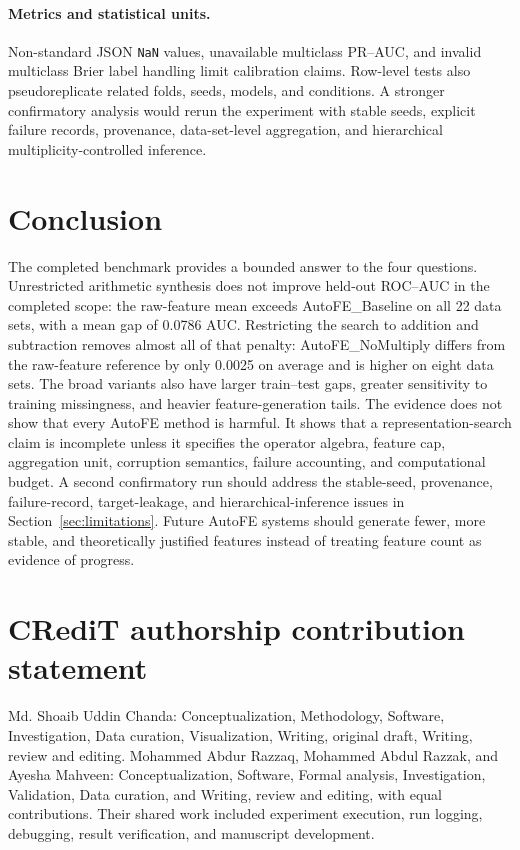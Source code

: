 \documentclass[preprint,12pt]{elsarticle}
\begin{document}
\paragraph{Metrics and statistical units.} Non-standard JSON \texttt{NaN} values, unavailable multiclass PR--AUC, and invalid multiclass Brier label handling limit calibration claims.  Row-level tests also pseudoreplicate related folds, seeds, models, and conditions.  A stronger confirmatory analysis would rerun the experiment with stable seeds, explicit failure records, provenance, data-set-level aggregation, and hierarchical multiplicity-controlled inference.

\section{Conclusion}
\label{sec:conclusion}

The completed benchmark provides a bounded answer to the four questions.  Unrestricted arithmetic synthesis does not improve held-out ROC--AUC in the completed scope: the raw-feature mean exceeds AutoFE\_Baseline on all 22 data sets, with a mean gap of 0.0786 AUC.  Restricting the search to addition and subtraction removes almost all of that penalty: AutoFE\_NoMultiply differs from the raw-feature reference by only 0.0025 on average and is higher on eight data sets.  The broad variants also have larger train--test gaps, greater sensitivity to training missingness, and heavier feature-generation tails.  The evidence does not show that every AutoFE method is harmful.  It shows that a representation-search claim is incomplete unless it specifies the operator algebra, feature cap, aggregation unit, corruption semantics, failure accounting, and computational budget.  A second confirmatory run should address the stable-seed, provenance, failure-record, target-leakage, and hierarchical-inference issues in Section~\ref{sec:limitations}.  Future AutoFE systems should generate fewer, more stable, and theoretically justified features instead of treating feature count as evidence of progress.

\section*{CRediT authorship contribution statement}
Md. Shoaib Uddin Chanda: Conceptualization, Methodology, Software, Investigation, Data curation, Visualization, Writing, original draft, Writing, review and editing.  Mohammed Abdur Razzaq, Mohammed Abdul Razzak, and Ayesha Mahveen: Conceptualization, Software, Formal analysis, Investigation, Validation, Data curation, and Writing, review and editing, with equal contributions.  Their shared work included experiment execution, run logging, debugging, result verification, and manuscript development.
\end{document}
